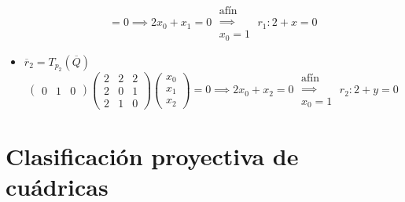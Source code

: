 \begin{example}
\begin{itemize}
\[                = 0 \implies 2x_0 + x_1 = 0 \;\substack{\text{afín} \\ \implies \\ x_0 = 1}\; r_1 \colon 2 + x = 0
            \]
        \item $\overline{r}_2 = T_{p_2}\left( \overline{Q} \right)$
            \[
                \begin{pmatrix}
                    0 & 1 & 0
                \end{pmatrix}
                \begin{pmatrix}
                    2 & 2 & 2 \\
                    2 & 0 & 1 \\
                    2 & 1 & 0
                \end{pmatrix}
                \begin{pmatrix}
                    x_0 \\ x_1 \\ x_2
                \end{pmatrix}
                = 0 \implies 2x_0 + x_2 = 0 \; \substack{\text{afín} \\ \implies \\ x_0 = 1}\; r_2 \colon 2 + y = 0
            \]
    \end{itemize}
\end{example}

\section{Clasificación proyectiva de cuádricas}

